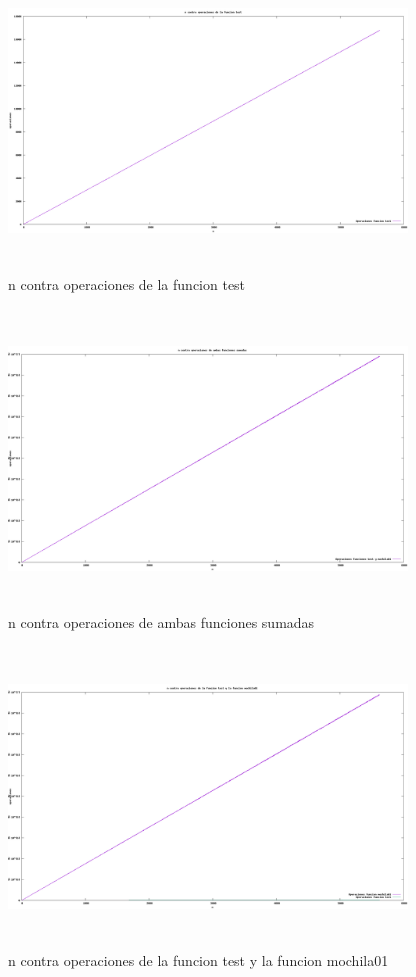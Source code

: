 \documentclass[spanish]{article}
\begin{document}
	 	\begin{figure}[H]
	 		\centering
	 		\includegraphics[width=400px,height=300px]{grafica5}
	 		\caption{n contra operaciones de la funcion test}
	 	\end{figure}
	 	\begin{figure}[H]
	 		\centering
	 		\includegraphics[width=400px,height=300px]{grafica6}
	 		\caption{n contra operaciones de ambas funciones sumadas}
	 	\end{figure}
	 	\begin{figure}[H]
	 		\centering
	 		\includegraphics[width=400px,height=300px]{grafica7}
	 		\caption{n contra operaciones de la funcion test y la funcion mochila01}
	 	\end{figure}
\end{document}
